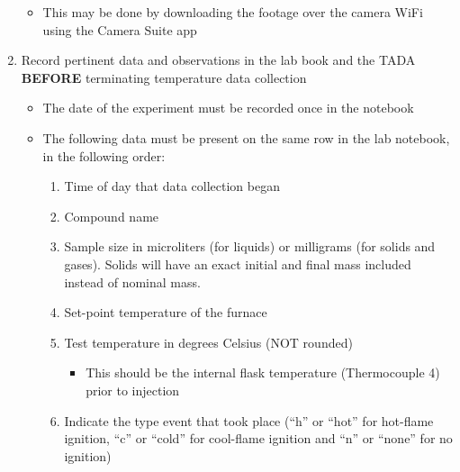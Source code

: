 \begin{enumerate}
  \begin{itemize}
  \tightlist
  \item
    This may be done by downloading the footage over the camera WiFi
    using the Camera Suite app
  \end{itemize}
\item
  Record pertinent data and observations in the lab book and the TADA
  \textbf{BEFORE} terminating temperature data collection

  \begin{itemize}
  \tightlist
  \item
    The date of the experiment must be recorded once in the notebook
  \item
    The following data must be present on the same row in the lab
    notebook, in the following order:

    \begin{enumerate}
    \def\labelenumii{\arabic{enumii}.}
    \tightlist
    \item
      Time of day that data collection began
    \item
      Compound name
    \item
      Sample size in microliters (for liquids) or milligrams (for solids
      and gases). Solids will have an exact initial and final mass
      included instead of nominal mass.
    \item
      Set-point temperature of the furnace
    \item
      Test temperature in degrees Celsius (NOT rounded)

      \begin{itemize}
      \tightlist
      \item
        This should be the internal flask temperature (Thermocouple 4)
        prior to injection
      \end{itemize}
    \item
      Indicate the type event that took place (``h'' or ``hot'' for
      hot-flame ignition, ``c'' or ``cold'' for cool-flame ignition and
      ``n'' or ``none'' for no ignition)


\end{enumerate}
\end{itemize}
\end{enumerate}
